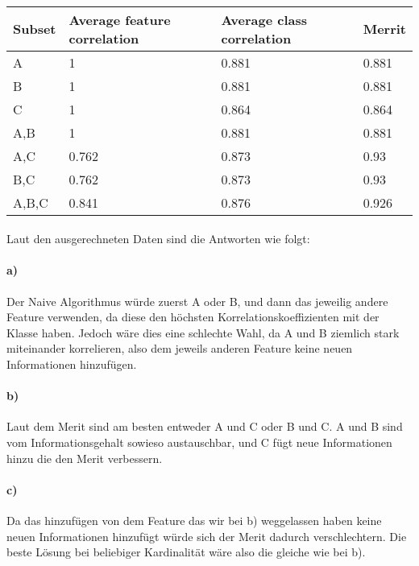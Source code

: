 \documentclass{article}
\begin{document}
\paragraph{}
\begin{tabular}{|l|l|l|l|}
	\hline
	Subset & Average feature correlation & Average class correlation & Merrit \\\hline
	{A} & 1 & 0.881 & 0.881 \\\hline
	{B} & 1 & 0.881 & 0.881 \\\hline
	{C} & 1 & 0.864 & 0.864 \\\hline
	{A,B} & 1 & 0.881 & 0.881 \\\hline
	{A,C} & 0.762 & 0.873 & 0.93 \\\hline
	{B,C} & 0.762 & 0.873 & 0.93 \\\hline
	{A,B,C} & 0.841 & 0.876 & 0.926 \\\hline
\end{tabular}

\paragraph{}
Laut den ausgerechneten Daten sind die Antworten wie folgt: 
\paragraph{a)}
Der Naive Algorithmus würde zuerst A oder B, und dann das jeweilig andere Feature verwenden, da diese den höchsten Korrelationskoeffizienten mit der Klasse haben. Jedoch wäre dies eine schlechte Wahl, da A und B ziemlich stark miteinander korrelieren, also dem jeweils anderen Feature keine neuen Informationen hinzufügen.
\paragraph{b)}
Laut dem Merit sind am besten entweder A und C oder B und C. A und B sind vom Informationsgehalt sowieso austauschbar, und C fügt neue Informationen hinzu die den Merit verbessern.
\paragraph{c)}
Da das hinzufügen von dem Feature das wir bei b) weggelassen haben keine neuen Informationen hinzufügt würde sich der Merit dadurch verschlechtern. Die beste Lösung bei beliebiger Kardinalität wäre also die gleiche wie bei b).
\end{document}
